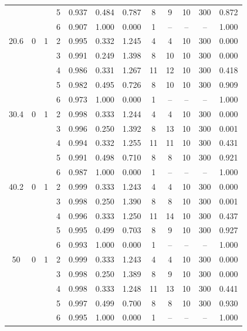 \documentclass[12pt]{article}
\begin{document}
\begin{table}
\begin{ruledtabular}
\begin{tabular}{cccccccccccc}
 & &  & 5 & 0.937 & 0.484 & 0.787 & 8 & 9 & 10 & 300 & 0.872 \\
 & &  & 6 & 0.907 & 1.000 & 0.000 & 1 & -- & -- & -- & 1.000 \\
\hline
20.6 & 0 & 1 & 2 & 0.995 & 0.332 & 1.245 & 4 & 4 & 10 & 300 & 0.000 \\
 & &  & 3 & 0.991 & 0.249 & 1.398 & 8 & 10 & 10 & 300 & 0.000 \\
 & &  & 4 & 0.986 & 0.331 & 1.267 & 11 & 12 & 10 & 300 & 0.418 \\
 & &  & 5 & 0.982 & 0.495 & 0.726 & 8 & 10 & 10 & 300 & 0.909 \\
 & &  & 6 & 0.973 & 1.000 & 0.000 & 1 & -- & -- & -- & 1.000 \\
\hline
30.4 & 0 & 1 & 2 & 0.998 & 0.333 & 1.244 & 4 & 4 & 10 & 300 & 0.000 \\
 & &  & 3 & 0.996 & 0.250 & 1.392 & 8 & 13 & 10 & 300 & 0.001 \\
 & &  & 4 & 0.994 & 0.332 & 1.255 & 11 & 11 & 10 & 300 & 0.431 \\
 & &  & 5 & 0.991 & 0.498 & 0.710 & 8 & 8 & 10 & 300 & 0.921 \\
 & &  & 6 & 0.987 & 1.000 & 0.000 & 1 & -- & -- & -- & 1.000 \\
\hline
40.2 & 0 & 1 & 2 & 0.999 & 0.333 & 1.243 & 4 & 4 & 10 & 300 & 0.000 \\
 & &  & 3 & 0.998 & 0.250 & 1.390 & 8 & 8 & 10 & 300 & 0.001 \\
 & &  & 4 & 0.996 & 0.333 & 1.250 & 11 & 14 & 10 & 300 & 0.437 \\
 & &  & 5 & 0.995 & 0.499 & 0.703 & 8 & 9 & 10 & 300 & 0.927 \\
 & &  & 6 & 0.993 & 1.000 & 0.000 & 1 & -- & -- & -- & 1.000 \\
\hline
50 & 0 & 1 & 2 & 0.999 & 0.333 & 1.243 & 4 & 4 & 10 & 300 & 0.000 \\
 & &  & 3 & 0.998 & 0.250 & 1.389 & 8 & 9 & 10 & 300 & 0.000 \\
 & &  & 4 & 0.998 & 0.333 & 1.248 & 11 & 13 & 10 & 300 & 0.441 \\
 & &  & 5 & 0.997 & 0.499 & 0.700 & 8 & 8 & 10 & 300 & 0.930 \\
 & &  & 6 & 0.995 & 1.000 & 0.000 & 1 & -- & -- & -- & 1.000
\end{tabular}
\end{ruledtabular}
\end{table}
\end{document}
